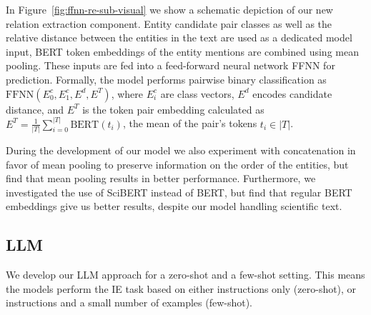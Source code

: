 In Figure~\ref{fig:ffnn-re-sub-visual} we show a schematic depiction of our new relation extraction component. Entity candidate pair classes as well as the relative distance between the entities in the text are used as a dedicated model input, BERT token embeddings of the entity mentions are combined using mean pooling. These inputs are fed into a feed-forward neural network FFNN for prediction. Formally, the model performs pairwise binary classification as $\text{FFNN}(E^c_0, E^c_1, E^d, E^T)$, where $E^c_i$ are class vectors, $E^d$ encodes candidate distance, and $E^T$ is the token pair embedding calculated as $E^T=\frac{1}{|T|}\sum^{|T|}_{i=0}\text{BERT}(t_i)$, the mean of the pair's tokens $t_i\in|T|$.


During the development of our model we also experiment with concatenation in favor of mean pooling to preserve information on the order of the entities, but find that mean pooling results in better performance. Furthermore, we investigated the use of SciBERT instead of BERT, but find that regular BERT embeddings give us better results, despite our model handling scientific text.


\subsection{LLM}\label{sec:methLLMs}

We develop our LLM approach for a zero-shot and a few-shot setting. This means the models perform the IE task based on either instructions only (zero-shot), or instructions and a small number of examples (few-shot).




